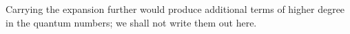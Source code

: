 Carrying the expansion further would produce additional terms of higher degree in the quantum numbers; we shall not write them out here.
